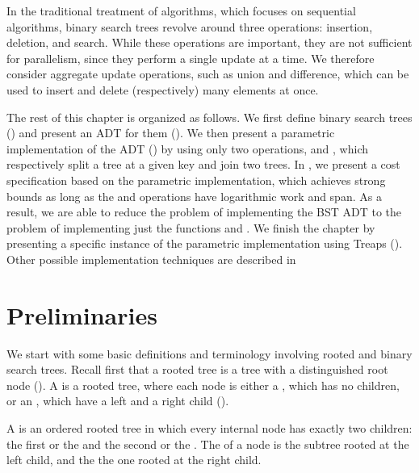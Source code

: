 In the traditional treatment of algorithms, which focuses on
sequential algorithms, binary search trees revolve around three
operations: insertion, deletion, and search.
%
While these operations are important, they are not sufficient for
parallelism, since they perform a single update at a time.
% 
We therefore consider aggregate update operations, such as union and
difference, which can be used to insert and delete (respectively) many
elements at once.

The rest of this chapter is organized as follows.  We first define
binary search trees ()
and present an ADT for them (). 
%
We then present a parametric implementation of the ADT
() by using only two operations, 
and , which respectively split a tree at a given key and
join two trees.
%
In , we present a cost specification based on the
parametric implementation, which achieves strong bounds as long as the
 and  operations have logarithmic work and
span.
%
As a result, we are able to reduce the problem of implementing the BST
ADT to the problem of implementing just the functions 
and .  
%
We finish the chapter by presenting a specific instance of the
parametric implementation using Treaps ().
%
Other possible implementation techniques are described in


\section{Preliminaries}
\label{sec:bst::prelim}

We start with some basic definitions and terminology involving rooted
and binary search trees.  Recall first that a rooted tree is a tree
with a distinguished root node (). 
%
A  is a rooted tree, where each node is either
a , which has no children, or an ,
which have a left and a right child ().
%
\begin{definition}
\label{def:bst::binarytree}
A  is an ordered rooted tree in which every
internal node has exactly two children: the first or the  and the second or the .  
%
The  of a node is the subtree rooted at the left
child, and the  the one rooted at the right child.
\end{definition}

